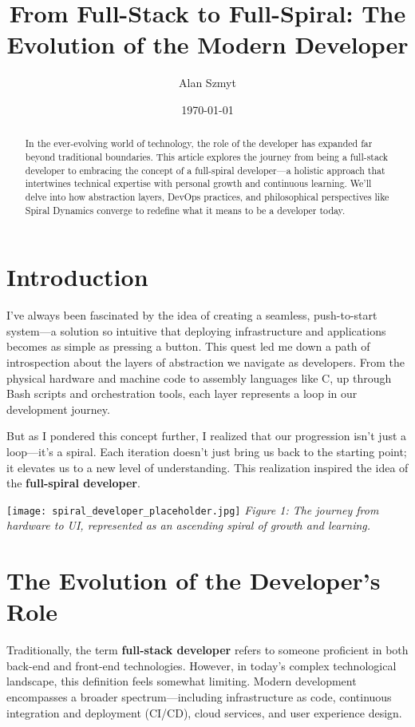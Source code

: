 \documentclass{article}
\title{From Full-Stack to Full-Spiral: The Evolution of the Modern Developer}
\author{Alan Szmyt}
\date{\today}
\begin{document}
\maketitle

\begin{abstract}
In the ever-evolving world of technology, the role of the developer has expanded far beyond traditional boundaries. This article explores the journey from being a full-stack developer to embracing the concept of a full-spiral developer—a holistic approach that intertwines technical expertise with personal growth and continuous learning. We'll delve into how abstraction layers, DevOps practices, and philosophical perspectives like Spiral Dynamics converge to redefine what it means to be a developer today.
\end{abstract}

\section{Introduction}

I've always been fascinated by the idea of creating a seamless, push-to-start system—a solution so intuitive that deploying infrastructure and applications becomes as simple as pressing a button. This quest led me down a path of introspection about the layers of abstraction we navigate as developers. From the physical hardware and machine code to assembly languages like C, up through Bash scripts and orchestration tools, each layer represents a loop in our development journey.

But as I pondered this concept further, I realized that our progression isn't just a loop—it's a spiral. Each iteration doesn't just bring us back to the starting point; it elevates us to a new level of understanding. This realization inspired the idea of the \textbf{full-spiral developer}.

\vspace{0.5cm}
\noindent\texttt{[image: spiral\_developer\_placeholder.jpg]}
\newline
\textit{Figure 1: The journey from hardware to UI, represented as an ascending spiral of growth and learning.}
\vspace{0.5cm}

\section{The Evolution of the Developer's Role}

Traditionally, the term \textbf{full-stack developer} refers to someone proficient in both back-end and front-end technologies. However, in today's complex technological landscape, this definition feels somewhat limiting. Modern development encompasses a broader spectrum—including infrastructure as code, continuous integration and deployment (CI/CD), cloud services, and user experience design.
\end{document}
